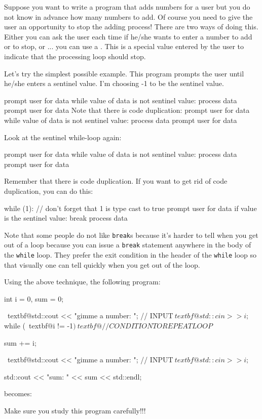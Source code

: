 \newpage{}

Suppose you want to write a program that adds numbers for a user but you
do not know in advance how many numbers to add. Of course you need to
give the user an opportunity to stop the adding process! There are two
ways of doing this. Either you can ask the user each time if he/she
wants to enter a number to add or to stop, or ... you can use a
. This is a special value entered by the user to
indicate that the processing loop should stop.

Let's try the simplest possible example. This program
prompts the user until he/she enters a sentinel value.
I'm choosing -1 to be the sentinel value.


prompt user for data
while value of data is not sentinel value:
process data
prompt user for data
Note that there is code duplication:
prompt user for data
while value of data is not sentinel value:
process data
prompt user for data


Look at the sentinel while-loop again:

prompt user for data
while value of data is not sentinel value:
process data
prompt user for data

Remember that there is code duplication. If you want to get rid of code
duplication, you can do this:

while (1): // don't forget that 1 is type cast to true
prompt user for data
if value is the sentinel value:
break
process data

Note that some people do not like \texttt{break}s because
it's harder to tell when you get out of a loop because
you can issue a \texttt{break} statement anywhere in the body of the
\texttt{while} loop. They prefer the exit condition in the header of the
\texttt{while} loop so that visually one can tell quickly when you get out
of the loop.

Using the above technique, the following program:

\begin{console}[commandchars=\~\@\$]
int i = 0, sum = 0;

~textbf@std::cout << "gimme a number: "; // INPUT$
~textbf@std::cin >> i;$
while (~textbf@i != -1$) ~textbf@// CONDITION TO REPEAT LOOP$
{     
      sum += i;
      
      ~textbf@std::cout << "gimme a number: "; // INPUT$
      ~textbf@std::cin >> i;$
}
std::cout << "sum: " << sum << std::endl;
\end{console}
becomes:
Make sure you study this program carefully!!!

